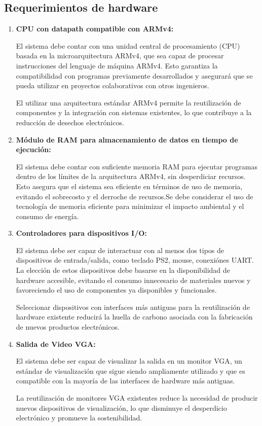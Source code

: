 \documentclass[conference]{IEEEtran}
\begin{document}
\subsection{Requerimientos de hardware}
\begin{enumerate}
	\item \textbf{CPU con datapath compatible con ARMv4:}
	\par El sistema debe contar con una unidad central de procesamiento (CPU) basada en la microarquitectura ARMv4, que sea capaz de procesar instrucciones del lenguaje de máquina ARMv4. Esto garantiza la compatibilidad con programas previamente desarrollados y asegurará que se pueda utilizar en proyectos colaborativos con otros ingenieros.
	\par El utilizar una arquitectura estándar ARMv4 permite la reutilización de componentes y la integración con sistemas existentes, lo que contribuye a la reducción de desechos electrónicos.
	
	\item \textbf{Módulo de RAM para almacenamiento de datos en tiempo de ejecución:}
	\par  El sistema debe contar con suficiente memoria RAM para ejecutar programas dentro de los límites de la arquitectura ARMv4, sin desperdiciar recursos. Esto asegura que el sistema sea eficiente en términos de uso de memoria, evitando el sobrecosto y el derroche de recursos.Se debe considerar el uso de tecnología de memoria eficiente para minimizar el impacto ambiental y el consumo de energía.
	
	\item \textbf{Controladores para dispositivos I/O:}
	\par El sistema debe ser capaz de interactuar con al menos dos tipos de dispositivos de entrada/salida, como teclado PS2, mouse, conexiónes UART. La elección de estos dispositivos debe basarse en la disponibilidad de hardware accesible, evitando el consumo innecesario de materiales nuevos y favoreciendo el uso de componentes ya disponibles y funcionales.
	
	\par Seleccionar dispositivos con interfaces más antiguas para la reutilización de hardware existente reducirá la huella de carbono asociada con la fabricación de nuevos productos electrónicos.
	
	\item \textbf{Salida de Video VGA:}
	\par El sistema debe ser capaz de visualizar la salida en un monitor VGA, un estándar de visualización que sigue siendo ampliamente utilizado y que es compatible con la mayoría de las interfaces de hardware más antiguas.
	
	\par La reutilización de monitores VGA existentes reduce la necesidad de producir nuevos dispositivos de visualización, lo que disminuye el desperdicio electrónico y promueve la sostenibilidad.
	
\end{enumerate}
\end{document}

